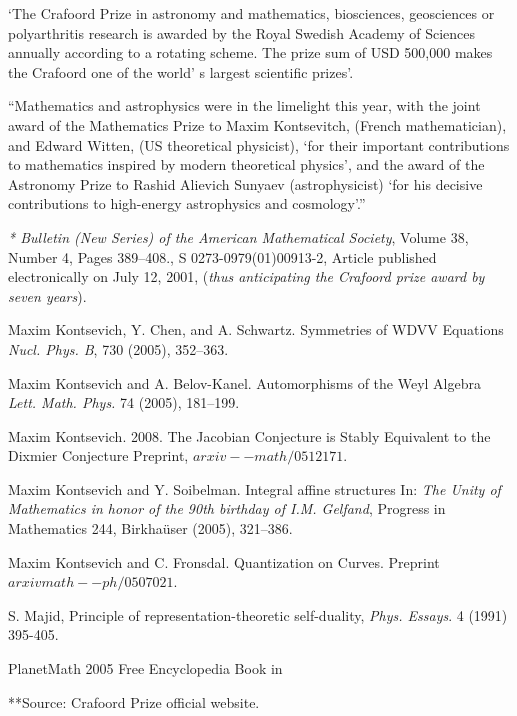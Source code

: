 \documentclass[12pt]{article}
\theoremstyle{plain}
\theoremstyle{definition}
\numberwithin{equation}{section}
\begin{document}
 `The Crafoord Prize in astronomy and mathematics, biosciences, geosciences or polyarthritis research is awarded by the Royal Swedish Academy of Sciences annually according to a rotating scheme. The prize sum of USD 500,000 makes the Crafoord one of the world' s largest scientific prizes'. 

 ``Mathematics and astrophysics were in the limelight this year, with the joint award of the Mathematics Prize to Maxim Kontsevitch, (French mathematician), and Edward Witten, (US theoretical physicist), `for their important contributions to mathematics inspired by modern theoretical physics', and the award of the Astronomy Prize to Rashid Alievich Sunyaev (astrophysicist) `for his decisive contributions to high-energy astrophysics and cosmology'.'' 


\begin{thebibliography}{99}

\emph{* Bulletin (New Series) of the American Mathematical Society}, Volume 38, Number 4, Pages 389--408.,
S 0273-0979(01)00913-2, Article published electronically on July 12, 2001, ({\em thus anticipating the Crafoord
prize award by seven years}).

Maxim Kontsevich, Y. Chen, and A. Schwartz. Symmetries of WDVV Equations
{\em Nucl. Phys. B}, 730 (2005), 352--363.

Maxim Kontsevich and A. Belov-Kanel. Automorphisms of the Weyl Algebra
{\em Lett. Math. Phys.} 74 (2005), 181--199.

Maxim Kontsevich. 2008. The Jacobian Conjecture is Stably Equivalent to the Dixmier Conjecture
Preprint, $arxiv--math/0512171$.

Maxim Kontsevich and Y. Soibelman. Integral affine structures
In: \emph{The Unity of Mathematics in honor of the 90th birthday of I.M. Gelfand}, Progress in Mathematics 244, Birkha\"user (2005), 321--386.

Maxim Kontsevich and C. Fronsdal. Quantization on Curves. Preprint $arxiv math--ph/0507021$.

S. Majid, Principle of representation-theoretic self-duality, \emph{Phys. Essays}. 4 (1991) 395-405.

PlanetMath 2005 Free Encyclopedia Book in 

\end{thebibliography}


**Source: Crafoord Prize official website.

\end{document}
